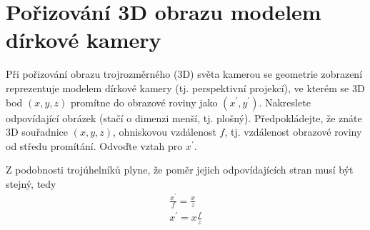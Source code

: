 \section{Pořizování 3D obrazu modelem dírkové kamery}
Při pořizování obrazu trojrozměrného (3D) světa kamerou se geometrie zobrazení reprezentuje modelem dírkové kamery (tj. 
perspektivní projekcí), ve kterém se 3D bod $(x,y,z)$ promítne do obrazové roviny jako $(x^{\prime},y^{\prime})$. 
Nakreslete odpovídající obrázek (stačí o dimenzi menší, tj. plošný). Předpokládejte, že znáte 3D souřadnice $(x,y,z)$, 
ohniskovou vzdálenost $f$, tj. vzdálenost obrazové roviny od středu promítání. Odvoďte vztah pro $x^{\prime}$.

\begin{figure}[H]
    \centering
\end{figure}
Z podobnosti trojúhelníků plyne, že poměr jejich odpovídajících stran musí být stejný, tedy
\begin{align}
    \frac{x^\prime}{f} = \frac{x}{z} \\
    x^\prime = x \frac{f}{z}
\end{align}